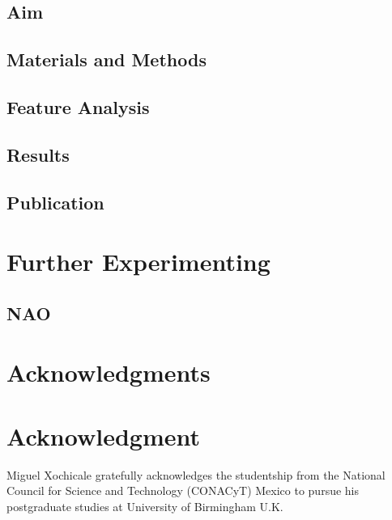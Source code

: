 \documentclass[10pt,journal,onecolumn,compsoc]{IEEEtran}
\begin{document}
\subsection{Aim}

\subsection{Materials and Methods}

\subsection{Feature Analysis}

\subsection{Results}

\subsection{Publication}




\section{Further Experimenting}


\subsection{NAO}



\ifCLASSOPTIONcompsoc
  \section*{Acknowledgments}
\else
  \section*{Acknowledgment}
\fi

Miguel Xochicale gratefully acknowledges the studentship from 
the National Council for Science and Technology (CONACyT) Mexico
to pursue his postgraduate studies at University of Birmingham U.K.

\ifCLASSOPTIONcaptionsoff
  \newpage
\fi
\end{document}
